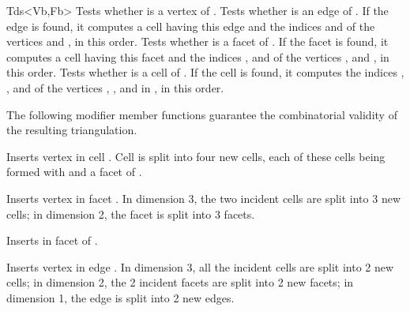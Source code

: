 \begin{ccClassTemplate}{Tds<Vb,Fb>}
{Tests whether  is a vertex of \ccVar.}
\ccGlue
{}
{Tests whether  is an edge of \ccVar. If the edge is found,
it computes a cell  having this edge and the indices 
and  of the vertices  and , in this order.}
\ccGlue
{}
{Tests whether  is a facet of \ccVar. If the facet is found,
it computes a cell  having this facet and the indices ,
 and  of the vertices ,  and , in
this order.} 
\ccGlue
{}
{Tests whether  is a cell of \ccVar. If the cell
 is found, it computes the indices , , 
and  of the vertices , ,  and  in
, in this order.} 

\ccModifiers

The following modifier member functions guarantee
the combinatorial validity of the resulting triangulation.

{Inserts vertex  in cell . Cell  is split into four
new cells, each of these cells being formed with  and a facet
of .
}

{Inserts vertex  in facet . In dimension 3, the two
incident cells are split into 3 new cells; in dimension 2, the facet is
split into 3 facets.
} 

{Inserts  in facet  of .
} 

{Inserts vertex  in edge . In dimension 3, all the
incident cells are split into 2 new cells; in dimension 2, the 2
incident facets are split into 2 new facets; in dimension 1, the edge is 
split into 2 new edges.
} 


\end{ccClassTemplate}
